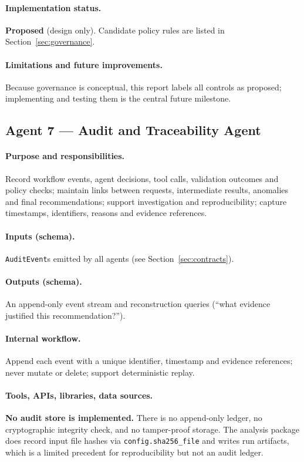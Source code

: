 \documentclass[11pt,a4paper]{article}
\newcommand{\code}[1]{\texttt{#1}}
\begin{document}
\paragraph{Implementation status.} \textbf{Proposed} (design only). Candidate policy rules are listed in Section~\ref{sec:governance}.

\paragraph{Limitations and future improvements.} Because governance is conceptual, this report labels all controls as proposed; implementing and testing them is the central future milestone.

\subsection{Agent 7 --- Audit and Traceability Agent}
\paragraph{Purpose and responsibilities.} Record workflow events, agent decisions, tool calls, validation outcomes and policy checks; maintain links between requests, intermediate results, anomalies and final recommendations; support investigation and reproducibility; capture timestamps, identifiers, reasons and evidence references.

\paragraph{Inputs (schema).} \code{AuditEvent}s emitted by all agents (see Section~\ref{sec:contracts}).

\paragraph{Outputs (schema).} An append-only event stream and reconstruction queries (``what evidence justified this recommendation?'').

\paragraph{Internal workflow.} Append each event with a unique identifier, timestamp and evidence references; never mutate or delete; support deterministic replay.

\paragraph{Tools, APIs, libraries, data sources.} \textbf{No audit store is implemented.} There is no append-only ledger, no cryptographic integrity check, and no tamper-proof storage. The analysis package does record input file hashes via \code{config.sha256\_file} and writes run artifacts, which is a limited precedent for reproducibility but not an audit ledger.
\end{document}
